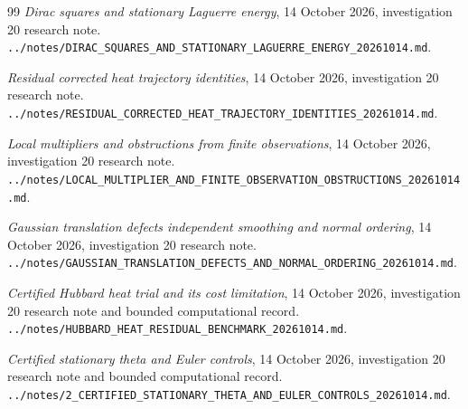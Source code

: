 \documentclass[11pt]{article}
\numberwithin{equation}{section}
\theoremstyle{definition}
\theoremstyle{remark}
\begin{document}
\begin{thebibliography}{99}
\emph{Dirac squares and stationary Laguerre energy},
14 October 2026, investigation 20 research note.
\nolinkurl{../notes/DIRAC_SQUARES_AND_STATIONARY_LAGUERRE_ENERGY_20261014.md}.

\emph{Residual corrected heat trajectory identities},
14 October 2026, investigation 20 research note.
\nolinkurl{../notes/RESIDUAL_CORRECTED_HEAT_TRAJECTORY_IDENTITIES_20261014.md}.

\emph{Local multipliers and obstructions from finite observations},
14 October 2026, investigation 20 research note.
\nolinkurl{../notes/LOCAL_MULTIPLIER_AND_FINITE_OBSERVATION_OBSTRUCTIONS_20261014.md}.

\emph{Gaussian translation defects independent smoothing and normal ordering},
14 October 2026, investigation 20 research note.
\nolinkurl{../notes/GAUSSIAN_TRANSLATION_DEFECTS_AND_NORMAL_ORDERING_20261014.md}.

\emph{Certified Hubbard heat trial and its cost limitation},
14 October 2026, investigation 20 research note and bounded computational record.
\nolinkurl{../notes/HUBBARD_HEAT_RESIDUAL_BENCHMARK_20261014.md}.

\emph{Certified stationary theta and Euler controls},
14 October 2026, investigation 20 research note and bounded computational record.
\nolinkurl{../notes/2_CERTIFIED_STATIONARY_THETA_AND_EULER_CONTROLS_20261014.md}.
\end{thebibliography}
\end{document}
